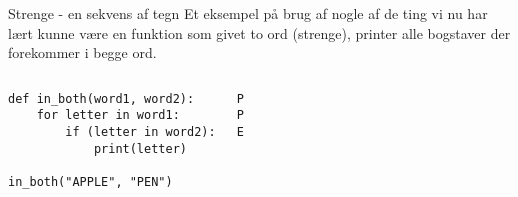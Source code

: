 \documentclass[main.tex]{subfiles}
\begin{document}
\begin{frame}[fragile]{Strenge - en sekvens af tegn}
	Et eksempel på brug af nogle af de ting vi nu har lært kunne være en funktion som givet to ord (strenge), printer alle bogstaver der forekommer i begge ord.
	\begin{columns}
		\begin{lstlisting}[style=python]
def in_both(word1, word2):
    for letter in word1:
        if (letter in word2):
            print(letter)
            
in_both("APPLE", "PEN")
		\end{lstlisting}

		\pause
		\begin{lstlisting}[style=python]
P
P
E
		\end{lstlisting}
	\end{columns}
\end{frame}






\end{document}
